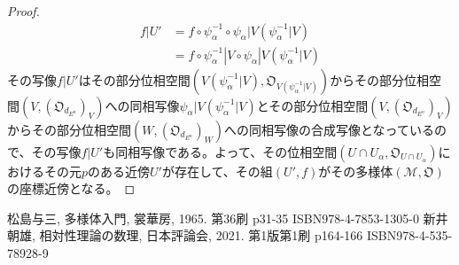 \documentclass[dvipdfmx]{jsarticle}
\begin{document}
\begin{proof}
\begin{align*}
f|U' &= f \circ \psi_\alpha^{-1} \circ \psi_\alpha |V\left( \psi_\alpha^{-1} |V \right) \\
&= f \circ \psi_\alpha^{-1} |V \circ \psi_\alpha |V\left( \psi_\alpha^{-1} |V \right) 
\end{align*}
その写像$f|U'$はその部分位相空間$\left(V\left( \psi_\alpha^{-1} |V \right) , \mathfrak{O}_{V\left( \psi_\alpha^{-1} |V \right) } \right)$からその部分位相空間$\left(V,\left(\mathfrak{O}_{d_{E^n}}\right)_{V}\right)$への同相写像$\psi_\alpha |V\left( \psi_\alpha^{-1} |V \right) $とその部分位相空間$\left(V,\left(\mathfrak{O}_{d_{E^n}}\right)_{V}\right)$からその部分位相空間$\left(W,\left(\mathfrak{O}_{d_{E^n}}\right)_{W}\right)$への同相写像の合成写像となっているので、その写像$f|U'$も同相写像である。よって、その位相空間$\left( U\cap U_\alpha ,\mathfrak{O}_{U\cap U_\alpha } \right)$におけるその元$p$のある近傍$U'$が存在して、その組$\left(U',f\right)$がその多様体$\left(\mathcal{M},\mathfrak{O}\right)$の座標近傍となる。
\end{proof}
\begin{thebibliography}{50}
  松島与三, 多様体入門, 裳華房, 1965. 第36刷 p31-35 ISBN978-4-7853-1305-0
  新井朝雄, 相対性理論の数理, 日本評論会, 2021. 第1版第1刷 p164-166 ISBN978-4-535-78928-9
\end{thebibliography}
\end{document}
